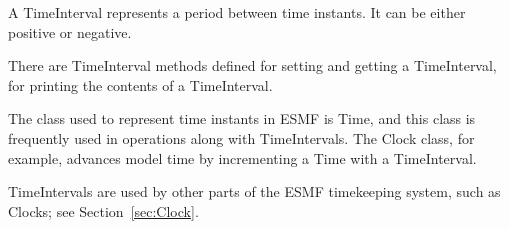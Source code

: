 
\label{sec:TimeInterval}
A TimeInterval represents a period between time instants. 
It can be either positive or negative.

There are TimeInterval methods defined for setting and getting 
a TimeInterval, for printing the contents of a TimeInterval.

The class used to represent time instants in ESMF is Time, 
and this class is frequently used in operations along with 
TimeIntervals.  The Clock class, for example, advances model time by 
incrementing a Time with a TimeInterval. 

TimeIntervals are used by other parts of the ESMF timekeeping 
system, such as Clocks; see Section~\ref{sec:Clock}.
